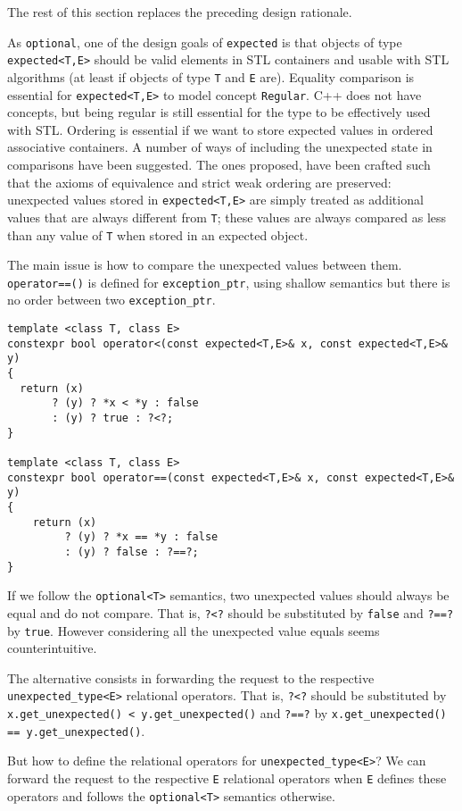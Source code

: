 \documentclass[a4paper,10pt]{article}
\newcommand{\cpp}[1]{\lstinline{#1}}
\newcommand{\update}[1]{\colorbox{update_color}{#1}}
\begin{document}
\update{The rest of this section replaces the preceding design rationale.}

As \cpp{optional}, one of the design goals of \cpp{expected} is that objects of type \cpp{expected<T,E>} should be valid elements in STL containers and usable with STL algorithms (at least if objects of type \cpp{T} and \cpp{E} are). Equality comparison is essential for \cpp{expected<T,E>} to model concept \cpp{Regular}. C++ does not have concepts, but being regular is still essential for the type to be effectively used with STL. Ordering is essential if we want to store expected values in ordered associative containers. A number of ways of including the unexpected state in comparisons have been suggested. The ones proposed, have been crafted such that the axioms of equivalence and strict weak ordering are preserved: unexpected values stored in \cpp{expected<T,E>} are simply treated as additional values that are always different from \cpp{T}; these values are always compared as less than any value of \cpp{T} when stored in an expected object. 

The main issue is how to compare the unexpected values between them.  \cpp{operator==()} is defined for \cpp{exception_ptr}, using shallow semantics but there is no order between two \cpp{exception_ptr}.

\begin{lstlisting}
template <class T, class E>
constexpr bool operator<(const expected<T,E>& x, const expected<T,E>& y)
{
  return (x)
       ? (y) ? *x < *y : false
       : (y) ? true : ?<?;
}

template <class T, class E>
constexpr bool operator==(const expected<T,E>& x, const expected<T,E>& y)
{
    return (x)
         ? (y) ? *x == *y : false
         : (y) ? false : ?==?;
}
\end{lstlisting}

If we follow the \cpp{optional<T>} semantics, two unexpected values should always be equal and do not compare. That is, \cpp{?<?} should be substituted by \cpp{false} and \cpp{?==?} by \cpp{true}. However considering all the unexpected value equals seems counterintuitive.

The alternative consists in forwarding the request to the respective  \cpp{unexpected_type<E>} relational operators. That is, \cpp{?<?} should be substituted by \cpp{x.get_unexpected() < y.get_unexpected()} and \cpp{?==?} by \cpp{x.get_unexpected()} \cpp{== y.get_unexpected()}. 

But how to define the relational operators for \cpp{unexpected_type<E>}? We can forward the request to the respective \cpp{E} relational operators when \cpp{E} defines these operators and follows the \cpp{optional<T>} semantics otherwise. 
\end{document}
